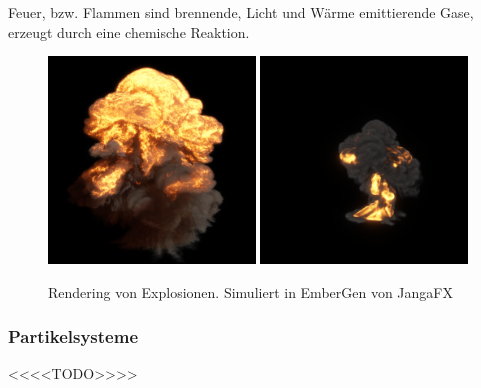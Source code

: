 Feuer, bzw. Flammen sind brennende, Licht und Wärme emittierende Gase, erzeugt durch eine chemische Reaktion. 
\begin{figure}[h!]
	\includegraphics[width=0.49\textwidth]{Grafiken/Basics/Fire/explosion_0000.png}
	\includegraphics[width=0.49\textwidth]{Grafiken/Basics/Fire/explosion2_0000_0000.png}
	\centering
	\begin{footnotesize}
		\caption{Rendering von Explosionen. Simuliert in EmberGen von JangaFX }

		\label{fig:explosion}
	\end{footnotesize}
\end{figure}


\subsubsection{Partikelsysteme}
<<<<TODO>>>>
